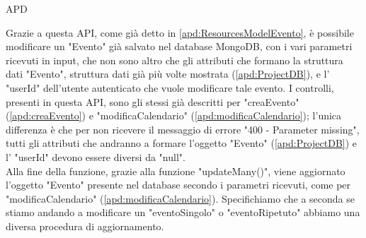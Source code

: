 \begin{listaPersonale} {APD}
\begin{listaPersonale2}[APD]{}
\begin{center}
                \end{center}
                Grazie a questa API, come già detto in \ref{apd:ResourcesModelEvento}, è possibile modificare un "Evento" già salvato nel database MongoDB, con i vari parametri ricevuti in input, che non sono altro che gli attributi che formano la struttura dati "Evento", struttura dati già più volte mostrata (\ref{apd:ProjectDB}), e l' "userId" dell'utente autenticato che vuole modificare tale evento. I controlli, presenti in questa API, sono gli stessi già descritti per "creaEvento" (\ref{apd:creaEvento}) e "modificaCalendario" (\ref{apd:modificaCalendario}); l'unica differenza è che per non ricevere il messaggio di errore "400 - Parameter missing", tutti gli attributi che andranno a formare l'oggetto "Evento" (\ref{apd:ProjectDB}) e l' "userId" devono essere diversi da "null". \\
                Alla fine della funzione, grazie alla funzione "updateMany()", viene aggiornato l'oggetto "Evento" presente nel database secondo i parametri ricevuti, come per "modificaCalendario" (\ref{apd:modificaCalendario}). Specifichiamo che a seconda se stiamo andando a modificare un "eventoSingolo" o "eventoRipetuto" abbiamo una diversa procedura di aggiornamento.
                \begin{center}

\end{center}
\end{listaPersonale2}
\end{listaPersonale}
